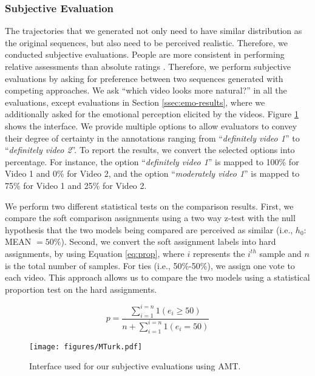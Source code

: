\documentclass[10pt,journal,compsoc]{IEEEtran}
\begin{document}
\subsubsection{Subjective Evaluation}
\label{ssec:subeval2}
The trajectories that we generated not only need to have similar distribution as the original sequences, but also  need to be perceived realistic. Therefore, we conducted subjective evaluations. People are more consistent in performing relative assessments than absolute ratings \cite{Yannakakis_2017}. Therefore, we perform subjective evaluations by asking for preference between two sequences generated with competing approaches. We ask ``which video looks more natural?'' in all the evaluations, except evaluations in Section \ref{ssec:emo-results}, where we additionally asked for the emotional perception elicited by the videos.  Figure \ref{fig:mturk} shows the interface. We provide multiple options to allow evaluators to convey their degree of certainty in the annotations ranging from ``\emph{definitely video 1}'' to ``\emph{definitely video 2}''. To report the results, we convert the selected options into percentage. For instance, the option ``\emph{definitely video 1}'' is mapped to 100\% for Video 1 and 0\% for Video 2, and the option ``\emph{moderately video 1}'' is mapped to 75\% for Video 1 and 25\% for Video 2.

We perform two different statistical tests on the comparison results. First, we compare the soft comparison assignments using a two way z-test with the null hypothesis that the two models being compared are perceived as similar (i.e., $h_0:$ MEAN $=50\%$). Second, we convert the soft assignment labels into hard assignments, by using Equation \ref{eq:prop}, where $i$ represents the $i^{th}$ sample and $n$ is the total number of samples.  For ties (i.e., 50\%-50\%), we assign one vote to each video. This approach allows us to compare the two models using a statistical proportion test on the hard assignments.


\begin{equation}
p = \frac{\sum_{i=1}^{i=n} 1 \left( e_i \geqslant 50\right)}{n+\sum_{i=1}^{i=n} 1 \left( e_i = 50\right)}
\label{eq:prop}
\end{equation}


\begin{figure}
	\centering
	\texttt{[image: figures/MTurk.pdf]}
	\caption{Interface used for our subjective evaluations using AMT.}
	\label{fig:mturk}
\end{figure} 
\end{document}
